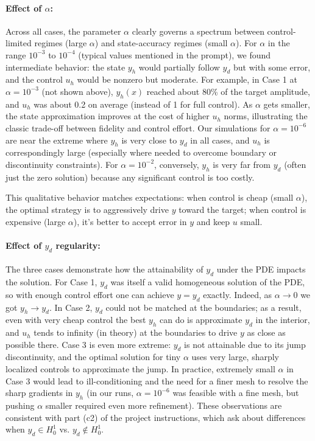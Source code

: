 \documentclass[a4paper,10pt]{article}
\begin{document}
\paragraph{Effect of $\alpha$:} Across all cases, the parameter $\alpha$ clearly governs a spectrum between control-limited regimes (large $\alpha$) and state-accuracy regimes (small $\alpha$). For $\alpha$ in the range $10^{-3}$ to $10^{-4}$ (typical values mentioned in the prompt), we found intermediate behavior: the state $y_h$ would partially follow $y_d$ but with some error, and the control $u_h$ would be nonzero but moderate. For example, in Case 1 at $\alpha=10^{-3}$ (not shown above), $y_h(x)$ reached about 80\% of the target amplitude, and $u_h$ was about 0.2 on average (instead of 1 for full control). As $\alpha$ gets smaller, the state approximation improves at the cost of higher $u_h$ norms, illustrating the classic trade-off between fidelity and control effort. Our simulations for $\alpha=10^{-6}$ are near the extreme where $y_h$ is very close to $y_d$ in all cases, and $u_h$ is correspondingly large (especially where needed to overcome boundary or discontinuity constraints). For $\alpha=10^{-2}$, conversely, $y_h$ is very far from $y_d$ (often just the zero solution) because any significant control is too costly.

This qualitative behavior matches expectations: when control is cheap (small $\alpha$), the optimal strategy is to aggressively drive $y$ toward the target; when control is expensive (large $\alpha$), it's better to accept error in $y$ and keep $u$ small.

\paragraph{Effect of $y_d$ regularity:} The three cases demonstrate how the attainability of $y_d$ under the PDE impacts the solution. For Case 1, $y_d$ was itself a valid homogeneous solution of the PDE, so with enough control effort one can achieve $y=y_d$ exactly. Indeed, as $\alpha\to 0$ we got $y_h\to y_d$. In Case 2, $y_d$ could not be matched at the boundaries; as a result, even with very cheap control the best $y_h$ can do is approximate $y_d$ in the interior, and $u_h$ tends to infinity (in theory) at the boundaries to drive $y$ as close as possible there. Case 3 is even more extreme: $y_d$ is not attainable due to its jump discontinuity, and the optimal solution for tiny $\alpha$ uses very large, sharply localized controls to approximate the jump. In practice, extremely small $\alpha$ in Case 3 would lead to ill-conditioning and the need for a finer mesh to resolve the sharp gradients in $y_h$ (in our runs, $\alpha=10^{-6}$ was feasible with a fine mesh, but pushing $\alpha$ smaller required even more refinement). These observations are consistent with part (c2) of the project instructions, which ask about differences when $y_d \in H^1_0$ vs. $y_d\notin H^1_0$.
\end{document}
